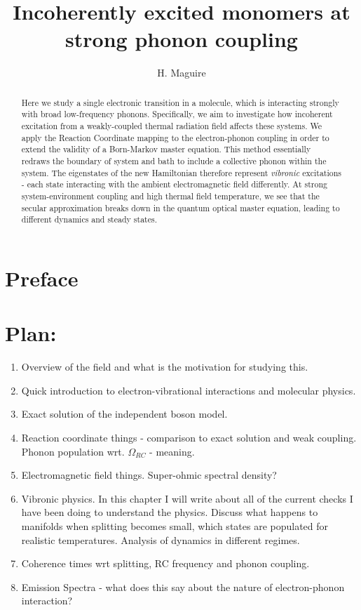 \documentclass[]{article}
\title{Incoherently excited monomers at strong phonon coupling}
\author[1]{H. Maguire}
\affil[1]{Photon Science Institute and School of Physics and Astronomy, The University of Manchester, Oxford Road,
	Manchester M13 9PL, United Kingdom}
\begin{document}
\tableofcontents
\section*{Preface}

\maketitle
\begin{abstract}
Here we study a single electronic transition in a molecule, which is interacting strongly with broad low-frequency phonons. Specifically, we aim to investigate how incoherent excitation from a weakly-coupled thermal radiation field affects these systems. We apply the Reaction Coordinate mapping to the electron-phonon coupling in order to extend the validity of a Born-Markov master equation. This method essentially redraws the boundary of system and bath to include a collective phonon within the system. The eigenstates of the new Hamiltonian therefore represent \textit{vibronic} excitations - each state interacting with the ambient electromagnetic field differently. At strong system-environment coupling and high thermal field temperature, we see that the secular approximation breaks down in the quantum optical master equation, leading to different dynamics and steady states.
\end{abstract}
 
\section{Plan:}
\begin{enumerate}
	\item Overview of the field and what is the motivation for studying this.
	\item Quick introduction to electron-vibrational interactions and molecular physics.
	\item Exact solution of the independent boson model.
	\item Reaction coordinate things - comparison to exact solution and weak coupling. Phonon population wrt. $\Omega_{RC}$ - meaning.
	\item Electromagnetic field things. Super-ohmic spectral density?
	\item Vibronic physics. In this chapter I will write about all of the current checks I have been doing to understand the physics. Discuss what happens to manifolds when splitting becomes small, which states are populated for realistic temperatures. Analysis of dynamics in different regimes.
	\item Coherence times wrt splitting, RC frequency and phonon coupling.
	\item Emission Spectra - what does this say about the nature of electron-phonon interaction?
\end{enumerate}
\end{document}
